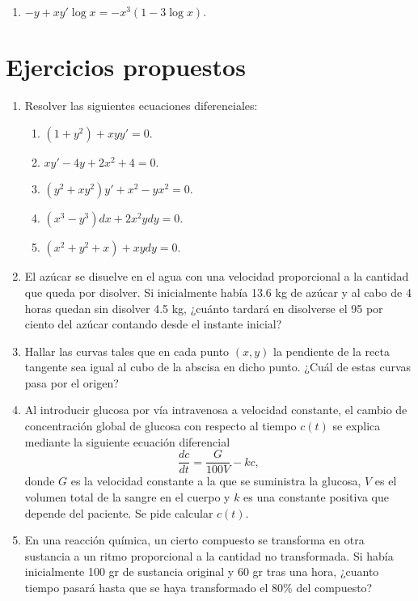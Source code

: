 \begin{enumerate}[leftmargin=*]
\begin{enumerate}
\item $-y+xy'\log x=-x^3(1-3\log x).$

\end{enumerate}

\end{enumerate}


\section{Ejercicios propuestos}
\begin{enumerate}[leftmargin=*]

\item Resolver las siguientes ecuaciones diferenciales:

\begin{enumerate}
\item $(1+y^{2})+xyy'=0$.
\item $xy'-4y+2x^2+4=0$.
\item $(y^{2}+xy^{2})y'+x^{2}-yx^{2}=0$.
\item $(x^3-y^3)dx+2x^2ydy=0$.
\item $(x^2+y^2+x)+xydy=0$.
\end{enumerate}

\item El azúcar se disuelve en el agua con una velocidad proporcional a la cantidad que queda por disolver. Si inicialmente había 13.6 kg de azúcar y al cabo de 4 horas quedan sin disolver 4.5 kg, ¿cuánto tardará en disolverse el 95 por ciento del azúcar contando desde el instante inicial?

\item Hallar las curvas tales que en cada punto $(x,y)$ la pendiente de la recta tangente sea igual al cubo de la abscisa en dicho punto. ¿Cuál de estas curvas pasa por el origen?

\item Al introducir glucosa por vía intravenosa a velocidad constante, el cambio de concentración global de glucosa  con respecto al tiempo $c(t)$ se explica mediante la siguiente ecuación diferencial
\[
\frac{dc}{dt}=\frac{G}{100V}-kc,
\]
donde $G$ es la velocidad constante a la que se suministra la glucosa, $V$ es el volumen total de la sangre en el cuerpo y $k$ es una constante positiva que depende del paciente. Se pide calcular $c(t)$.

\item En una reacción química, un cierto compuesto se transforma en otra sustancia a un ritmo proporcional a la cantidad no transformada. Si había inicialmente 100 gr de sustancia original y 60 gr tras una hora, ¿cuanto tiempo pasará hasta que se haya transformado el 80\% del compuesto?

\end{enumerate}

